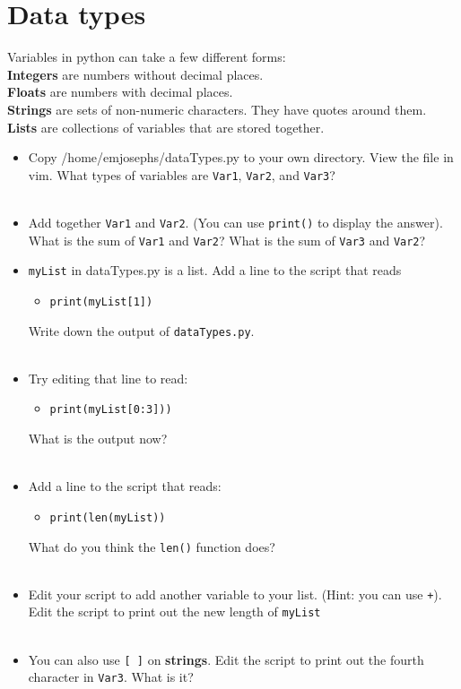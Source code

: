 \documentclass[11pt]{article}
\begin{document}
\section*{Data types}
Variables in python can take a few different forms:\\
  \textbf{Integers} are numbers without decimal places.\\
  \textbf{Floats} are numbers with decimal places.\\
  \textbf{Strings} are sets of non-numeric characters. They have quotes around them. \\
  \textbf{Lists} are collections of variables that are stored together. \\
\begin{itemize}
\item Copy /home/emjosephs/dataTypes.py to your own directory. View the file in vim. What types of variables are \texttt{Var1},  \texttt{Var2}, and  \texttt{Var3}?\\
  \\
\item Add together \texttt{Var1} and \texttt{Var2}. (You can use \texttt{print()} to display the answer). What is the sum of \texttt{Var1} and \texttt{Var2}?  What is the sum of \texttt{Var3} and \texttt{Var2}?
  \\
\item \texttt{myList} in dataTypes.py is a list. Add a line to the script that reads
  \begin{itemize}
    \item \texttt {print(myList[1])}
  \end{itemize}
  Write down the output of \texttt{dataTypes.py}.
  \\
  \\
  \item Try editing that line to read:
\begin{itemize}
\item \texttt{print(myList[0:3]))}
  \end{itemize}
  What is the output now?
  \\
  \\
\item Add a line to the script that reads:
  \begin{itemize}
  \item \texttt{print(len(myList))}
  \end{itemize}
  What do you think the \texttt{len()} function does? \\
  \\

\item Edit your script to add another variable to your list. (Hint: you can use \texttt{+}). Edit the script to print out the new length of \texttt{myList}\\
  \\

  \item You can also use \texttt{[ ]} on \textbf{strings}. Edit the script to print out the fourth character in \texttt{Var3}. What is it? \\
\\
  
\end{itemize}
\end{document}
